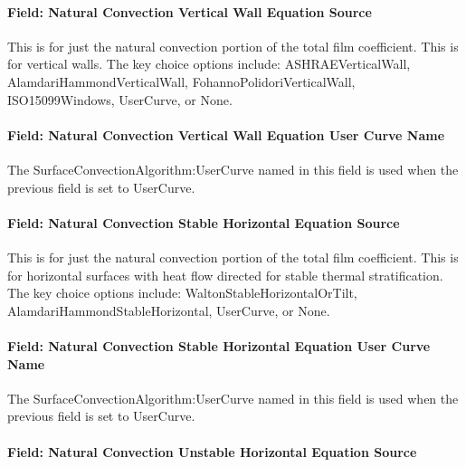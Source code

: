 \paragraph{Field: Natural Convection Vertical Wall Equation Source}\label{field-natural-convection-vertical-wall-equation-source}

This is for just the natural convection portion of the total film coefficient. This is for vertical walls. The key choice options include: ASHRAEVerticalWall, AlamdariHammondVerticalWall, FohannoPolidoriVerticalWall, ISO15099Windows, UserCurve, or None.

\paragraph{Field: Natural Convection Vertical Wall Equation User Curve Name}\label{field-natural-convection-vertical-wall-equation-user-curve-name}

The SurfaceConvectionAlgorithm:UserCurve named in this field is used when the previous field is set to UserCurve.

\paragraph{Field: Natural Convection Stable Horizontal Equation Source}\label{field-natural-convection-stable-horizontal-equation-source}

This is for just the natural convection portion of the total film coefficient. This is for horizontal surfaces with heat flow directed for stable thermal stratification. The key choice options include: WaltonStableHorizontalOrTilt, AlamdariHammondStableHorizontal, UserCurve, or None.

\paragraph{Field: Natural Convection Stable Horizontal Equation User Curve Name}\label{field-natural-convection-stable-horizontal-equation-user-curve-name}

The SurfaceConvectionAlgorithm:UserCurve named in this field is used when the previous field is set to UserCurve.

\paragraph{Field: Natural Convection Unstable Horizontal Equation Source}\label{field-natural-convection-unstable-horizontal-equation-source}

